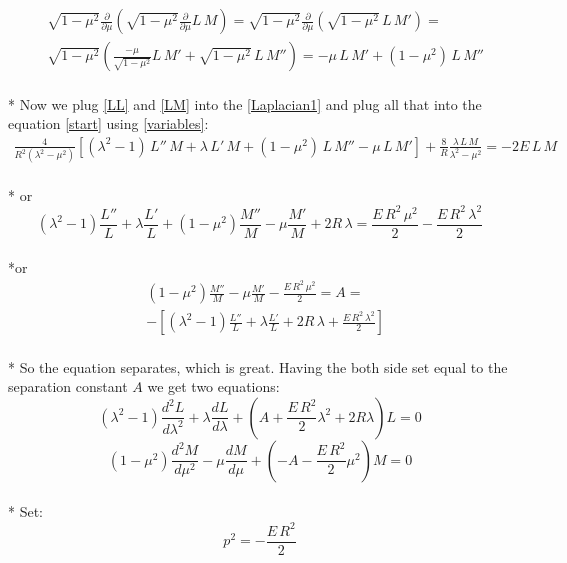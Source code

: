 \documentclass[11pt, oneside]{article}   	%
\begin{document}
\begin{equation}\label{LM}
\begin{split}
& \sqrt{1 - \mu^ 2}\frac{\partial}{\partial \mu}\left( \sqrt{1 - \mu^2 }\frac{\partial }{ \partial \mu}L\,M \right) = 
\sqrt{1 - \mu ^ 2}\frac{\partial}{\partial \mu}\left(  \sqrt{1 - \mu^2}\,L\, M'  \right) = \\
& \sqrt{1 - \mu ^ 2}\left( \frac{- \mu}{ \sqrt{1 - \mu^2} }L\,M' +  \sqrt{1-\mu^2 }\,L\,M'' \right)  = 
- \mu\,L\,M' + \left(1 - \mu^2 \right)\,L\,M''
\end{split}
\end{equation}\\*
Now we plug \eqref{LL} and \eqref{LM} into the \eqref{Laplacian1} and plug all that into the equation \eqref{start} using \eqref{variables}:
\begin{equation}
\begin{split}
 \frac{4}{R^2\left( \lambda ^2 - \mu ^ 2 \right)} \left[ \left(\lambda^2 - 1 \right)\,L''\,M + \lambda\,L'\,M + \left(1 - \mu^2 \right)\,L\,M'' - \mu\,L\,M'\right] +  \frac{8}{R}\frac{\lambda\,L\,M}{\lambda^2 - \mu^2} = -2 E\,L\,M
\end{split}
\end{equation}\\* or
\begin{equation}
 \left(\lambda^2 - 1 \right) \frac{L''}{L} + \lambda \frac{L'}{L}+ \left(1 - \mu^2 \right) \frac{M''}{M} - \mu\frac{M'}{M} + 2R\,\lambda = \frac{E\, R^2\,\mu^2}{2} - \frac{E\,R^2\,\lambda^2}{2}
\end{equation}\\*or
\begin{equation}
\begin{split}
& \left(1 - \mu^2 \right)\frac{M''}{M} - \mu\frac{M'}{M} - \frac{E\, R^2\,\mu^2}{2}  = A = \\[.8em]
& -\left[\left(\lambda^2 - 1 \right) \frac{L''}{L} + \lambda \frac{L'}{L} +2R\,\lambda + \frac{E\,R^2\,\lambda^2}{2}\right]
\end{split}
\end{equation}\\*
 So the equation separates, which is great. Having the both side set equal to the separation constant $ A$ we get two equations:
\begin{equation}\label{L}
\left(\lambda^2 - 1 \right) \frac{d^2L}{ d\lambda^2 }+\lambda\frac{ dL }{d\lambda }  + \left(A + \frac{E\,R^2}{2}\lambda^2 + 2R\lambda  \right)L = 0  
\end{equation}
\begin{equation}\label{M}
 \left(1 - \mu^2 \right) \frac{d^2M}{ d\mu^2 } - \mu\frac{ dM }{d\mu } +  \left(-A -  \frac{E\,R^2}{2}\mu^2  \right)M = 0
\end{equation}\\*
Set:
\begin{equation}
p^2 = -\frac{E\,R^2}{2}
\end{equation}
\end{document}
